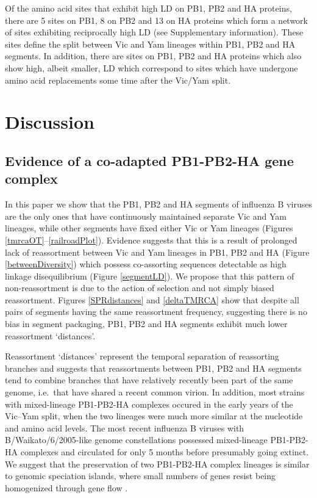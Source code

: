 \documentclass[11pt,oneside,letterpaper]{article}
\begin{document}
Of the amino acid sites that exhibit high LD on PB1, PB2 and HA proteins, there are 5 sites on PB1, 8 on PB2 and 13 on HA proteins which form a network of sites exhibiting reciprocally high LD (see Supplementary information).
These sites define the split between Vic and Yam lineages within PB1, PB2 and HA segments.
In addition, there are sites on PB1, PB2 and HA proteins which also show high, albeit smaller, LD which correspond to sites which have undergone amino acid replacements some time after the Vic/Yam split.

\section*{Discussion}

\subsection*{Evidence of a co-adapted PB1-PB2-HA gene complex}
In this paper we show that the PB1, PB2 and HA segments of influenza B viruses are the only ones that have continuously maintained separate Vic and Yam lineages, while other segments have fixed either Vic or Yam lineages (Figures \ref{tmrcaOT}--\ref{railroadPlot}).
Evidence suggests that this is a result of prolonged lack of reassortment between Vic and Yam lineages in PB1, PB2 and HA (Figure \ref{betweenDiversity}) which possess co-assorting sequences detectable as high linkage disequilibrium (Figure \ref{segmentLD}).
We propose that this pattern of non-reassortment is due to the action of selection and not simply biased reassortment.
Figures \ref{SPRdistances} and \ref{deltaTMRCA} show that despite all pairs of segments having the same reassortment frequency, suggesting there is no bias in segment packaging, PB1, PB2 and HA segments exhibit much lower reassortment `distances'.

Reassortment `distances' represent the temporal separation of reassorting branches and suggests that reassortments between PB1, PB2 and HA segments tend to combine branches that have relatively recently been part of the same genome, i.e.\ that have shared a recent common virion.
In addition, most strains with mixed-lineage PB1-PB2-HA complexes occured in the early years of the Vic--Yam split, when the two lineages were much more similar at the nucleotide and amino acid levels.
The most recent influenza B viruses with B/Waikato/6/2005-like genome constellations possessed mixed-lineage PB1-PB2-HA complexes and circulated for only 5 months before presumably going extinct.
We suggest that the preservation of two PB1-PB2-HA complex lineages is similar to genomic speciation islands, where small numbers of genes resist being homogenized through gene flow \cite{turner2005}.
\end{document}
